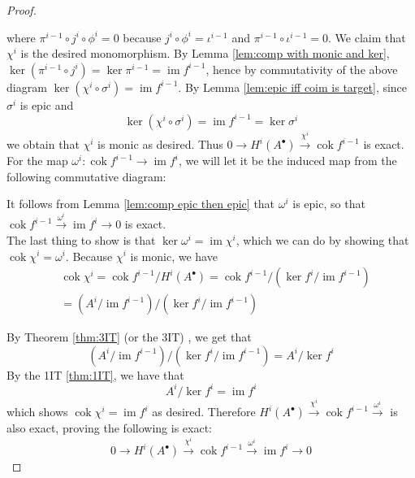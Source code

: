 \documentclass{article}
\DeclareMathOperator{\im}{\mathrm{im}}
\DeclareMathOperator{\cok}{\mathrm{cok}}
\begin{document}
\begin{proof}
    \begin{center}
    \end{center}
    where $\pi^{i-1}\circ j^i\circ \phi^i=0$ because $j^i\circ \phi^i=\iota^{i-1}$ and $\pi^{i-1}\circ \iota^{i-1}=0$.
    We claim that $\chi^i$ is the desired monomorphism. By Lemma \ref{lem:comp with monic and ker}, $\ker (\pi^{i-1}\circ j^i)=\ker \pi^{i-1}=\im f^{i-1}$, hence by commutativity of the above diagram $\ker (\chi^i \circ \sigma^i)=\im f^{i-1}$. By Lemma \ref{lem:epic iff coim is target}, since $\sigma^i$ is epic and
    \[
    \ker(\chi^i\circ \sigma^i)=\im f^{i-1}=\ker \sigma^i
    \]
    we obtain that $\chi^i$ is monic as desired. Thus $0\to H^i(A^\bullet)\xrightarrow{\chi^i}\cok f^{i-1}$ is exact.\\
    For the map $\omega^i:\cok f^{i-1}\to \im f^i$, we will let it be the induced map from the following commutative diagram:
    \begin{center}
    \end{center}
    It follows from Lemma \ref{lem:comp epic then epic} that $\omega^i$ is epic, so that $\cok f^{i-1}\xrightarrow{\omega^i}\im f^i\rightarrow 0$ is exact.\\
    The last thing to show is that $\ker \omega^i=\im \chi^i$, which we can do by showing that $\cok \chi^i=\omega^i$. Because $\chi^i$ is monic, we have 
    \begin{align*}
        &\cok \chi^i=\cok f^{i-1}/H^i(A^\bullet)=\cok f^{i-1}/(\ker f^i/\im f^{i-1})\\
        &=(A^i/\im f^{i-1})/(\ker f^i/ \im f^{i-1})
    \end{align*}
    
    
    By Theorem \ref{thm:3IT} (or the 3IT) , we get that
    \[
    (A^i/\im f^{i-1})/(\ker f^i/ \im f^{i-1})=A^i/\ker f^i
    \]
    By the 1IT \ref{thm:1IT}, we have that
    \[
    A^i/\ker f^i=\im f^i
    \]
    which shows $\cok \chi^i=\im f^i$ as desired. Therefore $H^i(A^\bullet) \xrightarrow{\chi^i} \cok f^{i-1} \xrightarrow{\omega^i}$ is also exact, proving the following is exact:
    \[
    0\rightarrow H^i(A^\bullet)\xrightarrow{\chi^i}\cok f^{i-1} \xrightarrow{\omega^i} \im f^i \rightarrow 0
    \]
\end{proof}
\end{document}
